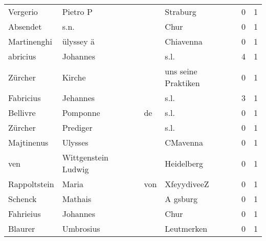 \begin{center}
\begin{tiny}
\begin{longtabu}{llllrr}
                 Vergerio &                           Pietro P &             &                                    Straburg &          0 &         1 \\
                 Absendet &                               s.n. &             &                                        Chur &          0 &         1 \\
              Martinenghi &                          ülyssey ä &             &                                   Chiavenna &          0 &         1 \\
                 abricius &                           Johannes &             &                                        s.l. &          4 &         1 \\
                  Zürcher &                             Kirche &             &                         uns seine Praktiken &          0 &         1 \\
                Fabricius &                           Jehannes &             &                                        s.l. &          3 &         1 \\
                 Bellivre &                           Pomponne &          de &                                        s.l. &          0 &         1 \\
                  Zürcher &                           Prediger &             &                                        s.l. &          0 &         1 \\
               Majtinenus &                            Ulysses &             &                                    CMavenna &          0 &         1 \\
                      ven &                Wittgenstein Ludwig &             &                                  Heidelberg &          0 &         1 \\
             Rappoltstein &                              Maria &         von &                                 XfeyydiveeZ &          0 &         1 \\
                  Schenck &                            Mathais &             &                                    A gsburg &          0 &         1 \\
                Fahrieius &                           Johannes &             &                                        Chur &          0 &         1 \\
                  Blaurer &                          Umbrosius &             &                                  Leutmerken &          0 &         1 \\

\end{longtabu}
\end{tiny}
\end{center}

